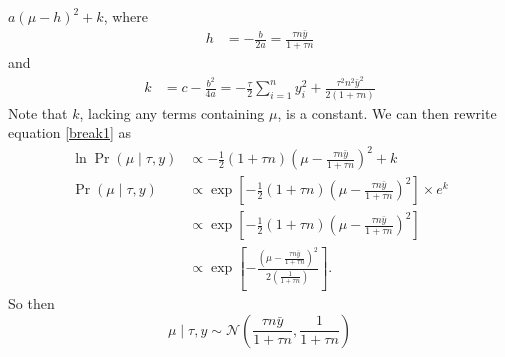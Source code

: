 \documentclass[letterpaper]{amsart}
\begin{document}
$a\left(\mu - h\right)^2+k$,
where
\begin{align}
  h &= -\frac{b}{2a}
      = \frac{\tau n\bar{y}}{1+\tau n}
\end{align}
and
\begin{align}
  k &= c-\frac{b^2}{4a}
      = -\frac{\tau}{2}
      \sum_{i=1}^n y_i^2
      +\frac{\tau^2 n^2\bar{y}^2}{2\left(1+\tau n\right)}
\end{align}
Note that $k$, lacking any terms containing $\mu$, is a constant.
We can then rewrite equation \ref{break1} as
\begin{align}
  \ln
  \Pr(\mu\mid\tau, y)
  &\propto
    -\frac{1}{2}
    \left(1+\tau n\right)
    \left(\mu - \frac{\tau n\bar{y}}{1+\tau n}\right)^2
    + k
  \\
  \Pr(\mu\mid\tau, y)
  &\propto
    \exp\left[
    -\frac{1}{2}
    \left(1+\tau n\right)
    \left(\mu - \frac{\tau n\bar{y}}{1+\tau n}\right)^2
    \right]
    \times
    e^k
  \\
  &\propto
    \exp\left[
    -\frac{1}{2}
    \left(1+\tau n\right)
    \left(\mu - \frac{\tau n\bar{y}}{1+\tau n}\right)^2
    \right]
  \\
  &\propto
    \exp\left[
    -\frac{
    \left(\mu - \frac{\tau n\bar{y}}{1+\tau n}\right)^2
    }{  
    2\left(\frac{1}{1+\tau n}\right)
    }
    \right].
\end{align}
So then
\begin{equation}
  \mu\mid\tau,y
  \sim \mathcal{N}\left(\frac{\tau n\bar{y}}{1+\tau n},
\frac{1}{1+\tau n}\right)
\end{equation}
\end{document}
